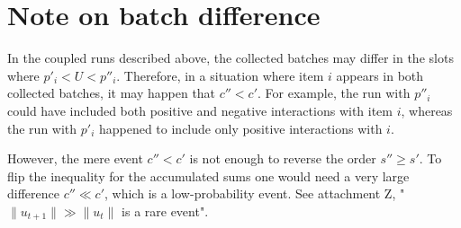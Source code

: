 \section{Note on batch difference}
\label{app:note-on-batch-difference}

In the coupled runs described above, the collected batches may differ in the slots where $p'_i < U < p''_i$. Therefore, in a situation where item $i$ appears in both collected batches, it may happen that $c'' < c'$. For example, the run with $p''_i$ could have included both positive and negative interactions with item $i$, whereas the run with $p'_i$ happened to include only positive interactions with $i$.

However, the mere event $c'' < c'$ is not enough to reverse the order $s'' \ge s'$. To flip the inequality for the accumulated sums one would need a very large difference $c'' \ll c'$, which is a low-probability event. See attachment Z, "$\|u_{t+1}\| \gg \|u_t\|$ is a rare event".


